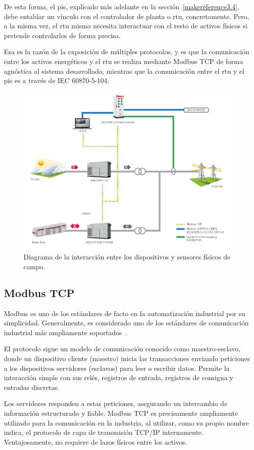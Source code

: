 De esta forma, el \gls{pis}, explicado más adelante en la sección~\ref{makereference3.4}, debe entablar un vínculo con el controlador de planta o \gls{rtu}, concretamente. Pero, a la misma vez, el \gls{rtu} mismo necesita interactuar con el resto de activos físicos si pretende controlarlos de forma precisa.

Esa es la razón de la exposición de múltiples protocolos, y es que la comunicación entre los activos energéticos y el \gls{rtu} se realiza mediante Modbus TCP de forma agnóstica al sistema desarrollado, mientras que la comunicación entre el \gls{rtu} y el \gls{pis} es a través de IEC 60870{-}5{-}104.

\begin{figure}
  \centering
  \includegraphics[width=0.5\linewidth]{figures/instrumentacion-de-campo.png}
  \caption[Diagrama de instrumentación de campo.]{Diagrama de la interacción entre los dispositivos y sensores físicos de campo.}%
  \label{fig:instrumentacion-de-campo}
\end{figure}

\subsection{Modbus TCP}%
\label{makereference3.3.1}

Modbus es uno de los estándares de facto en la automatización industrial por su simplicidad. Generalmente, es considerado uno de los estándares de comunicación industrial más ampliamente soportados~\cite{swales1999open}.

El protocolo sigue un modelo de comunicación conocido como maestro-esclavo, donde un dispositivo cliente (maestro) inicia las transacciones enviando peticiones a los dispositivos servidores (esclavos) para leer o escribir datos. Permite la interacción simple con sus relés, registros de entrada, registros de consigna y entradas discretas.

Los servidores responden a estas peticiones, asegurando un intercambio de información estructurado y fiable. Modbus TCP es precisamente ampliamente utilizado para la comunicación en la industria, al utilizar, como su propio nombre indica, el protocolo de capa de transmisión TCP/IP internamente. Ventajosamente, no requiere de lazos físicos entre los activos.

